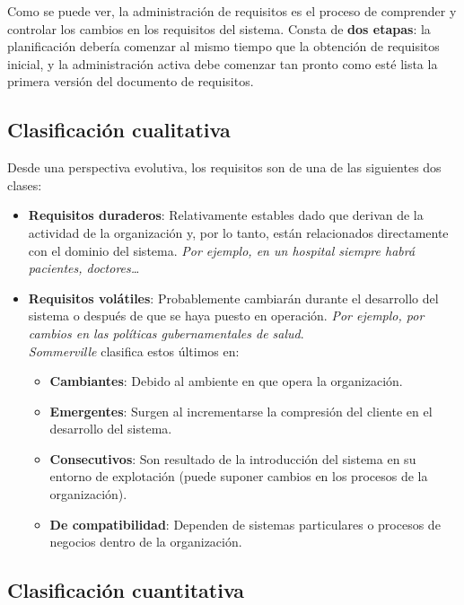 Como se puede ver, la administración de requisitos es el proceso de comprender y controlar los cambios en los requisitos del sistema. Consta de \textbf{dos etapas}: la planificación debería comenzar al mismo tiempo que la obtención de requisitos inicial, y la administración activa debe comenzar tan pronto como esté lista la primera versión del documento de requisitos.

\subsection{Clasificación cualitativa}

Desde una perspectiva evolutiva, los requisitos son de una de las siguientes dos clases:

\begin{itemize}
    \item \textbf{Requisitos duraderos}: Relativamente estables dado que derivan de la actividad de la organización y, por lo tanto, están relacionados directamente con el dominio del sistema. \textit{Por ejemplo, en un hospital siempre habrá pacientes, doctores\ldots}
    \item \textbf{Requisitos volátiles}: Probablemente cambiarán durante el desarrollo del sistema o después de que se haya puesto en operación. \textit{Por ejemplo, por cambios en las políticas gubernamentales de salud}.\\
    \textit{Sommerville} clasifica estos últimos en:
    \begin{itemize}
        \item \textbf{Cambiantes}: Debido al ambiente en que opera la organización.
        \item \textbf{Emergentes}: Surgen al incrementarse la compresión del cliente en el desarrollo del sistema.
        \item \textbf{Consecutivos}: Son resultado de la introducción del sistema en su entorno de explotación (puede suponer cambios en los procesos de la organización).
        \item \textbf{De compatibilidad}: Dependen de sistemas particulares o procesos de negocios dentro de la organización.
    \end{itemize}
\end{itemize}

\subsection{Clasificación cuantitativa}

